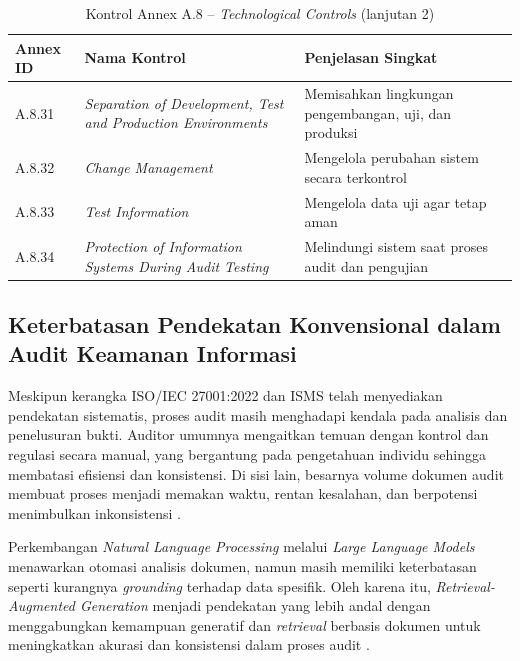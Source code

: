 \begin{table}[H]
\centering
\small
\caption{Kontrol Annex A.8 -- \textit{Technological Controls} (lanjutan 2) \cite{isoiec20227001}}
\label{tab:annex_a8_lanjutan2}
\begin{tabular}{|P{1.6cm}|P{5.0cm}|P{6.4cm}|}
\hline
\textbf{Annex ID} & \textbf{Nama Kontrol} & \textbf{Penjelasan Singkat} \\
\hline
A.8.31 & \textit{Separation of Development, Test and Production Environments}  & Memisahkan lingkungan pengembangan, uji, dan produksi \\
\hline
A.8.32 & \textit{Change Management}                                            & Mengelola perubahan sistem secara terkontrol \\
\hline
A.8.33 & \textit{Test Information}                                             & Mengelola data uji agar tetap aman \\
\hline
A.8.34 & \textit{Protection of Information Systems During Audit Testing}       & Melindungi sistem saat proses audit dan pengujian \\
\hline
\end{tabular}
\end{table}

\subsection{Keterbatasan Pendekatan Konvensional dalam Audit Keamanan Informasi}

Meskipun kerangka ISO/IEC 27001:2022 dan ISMS telah menyediakan pendekatan sistematis, proses audit masih menghadapi kendala pada analisis dan penelusuran bukti. Auditor umumnya mengaitkan temuan dengan kontrol dan regulasi secara manual, yang bergantung pada pengetahuan individu sehingga membatasi efisiensi dan konsistensi. Di sisi lain, besarnya volume dokumen audit membuat proses menjadi memakan waktu, rentan kesalahan, dan berpotensi menimbulkan inkonsistensi \cite{auditgpt2025}.

Perkembangan \textit{Natural Language Processing} melalui \textit{Large Language Models} menawarkan otomasi analisis dokumen, namun masih memiliki keterbatasan seperti kurangnya \textit{grounding} terhadap data spesifik. Oleh karena itu, \textit{Retrieval-Augmented Generation} menjadi pendekatan yang lebih andal dengan menggabungkan kemampuan generatif dan \textit{retrieval} berbasis dokumen untuk meningkatkan akurasi dan konsistensi dalam proses audit \cite{lajbr2025}.

